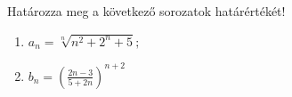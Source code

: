 \documentclass[11pt]{scrartcl}
\begin{document}
Határozza meg a következő sorozatok határértékét!
\begin{enumerate}
	\item \(\displaystyle
	      a_n = \sqrt[n]{n^2 + 2^n + 5};
	      \)

	\item \(\displaystyle
	      b_n = \left(
	      \frac{2n - 3}{5 + 2n}
	      \right)^{n + 2}
	      \)
\end{enumerate}
\end{document}

